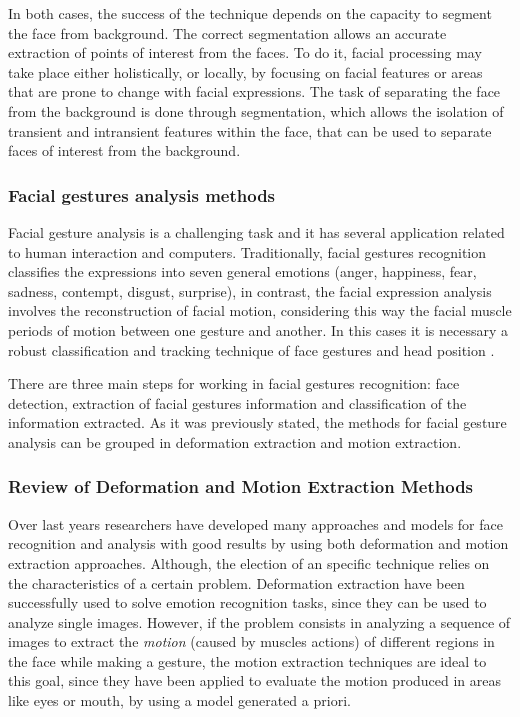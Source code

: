In both cases, the success of the technique depends on the capacity to segment the face from background. The correct segmentation allows an accurate extraction of points of interest from the faces. To do it, facial processing may take place either holistically, or locally, by focusing on facial features or areas that are prone to change with facial expressions. The task of separating the face from the background is done through segmentation, which allows the isolation of transient and intransient features within the face, that can be used to separate faces of interest from the background.

\subsubsection{Facial gestures analysis methods}
Facial gesture analysis is a challenging task and it has several application related to human interaction and computers. Traditionally, facial gestures recognition classifies the expressions into seven general emotions (anger, happiness, fear, sadness, contempt, disgust, surprise), in contrast, the facial expression analysis involves the reconstruction of facial motion, considering this way the facial muscle periods of motion between one gesture and another. In this cases it is necessary a robust classification and tracking technique of face gestures and head position \cite{Cinar01}.

There are three main steps for working in facial gestures recognition: face detection, extraction of facial gestures information and classification of the information extracted. As it was previously stated, the methods for facial gesture analysis can be grouped in deformation extraction and motion extraction.

\subsubsection{Review of Deformation and Motion Extraction Methods}
Over last years researchers have developed many approaches and models for face recognition and analysis with good results by using both deformation and motion extraction approaches. Although, the election of an specific technique relies on the characteristics of a certain problem. Deformation extraction have been successfully used to solve emotion recognition tasks, since they can be used to analyze single images. However, if the problem consists in analyzing a sequence of images to extract the \emph{motion} (caused by muscles actions) of different regions in the face while making a gesture, the motion extraction techniques are ideal to this goal, since they have been applied to evaluate the motion produced in areas like eyes or mouth, by using a model generated a priori.

